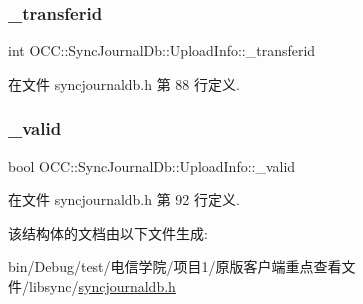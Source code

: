 \subsubsection{\texorpdfstring{\+\_\+transferid}{\_transferid}}
{\footnotesize\ttfamily int O\+C\+C\+::\+Sync\+Journal\+Db\+::\+Upload\+Info\+::\+\_\+transferid}



在文件 syncjournaldb.\+h 第 88 行定义.

\mbox{\label{struct_o_c_c_1_1_sync_journal_db_1_1_upload_info_a4742d1331bae058daccd0f4ec11c498a}} 
\subsubsection{\texorpdfstring{\+\_\+valid}{\_valid}}
{\footnotesize\ttfamily bool O\+C\+C\+::\+Sync\+Journal\+Db\+::\+Upload\+Info\+::\+\_\+valid}



在文件 syncjournaldb.\+h 第 92 行定义.



该结构体的文档由以下文件生成\+:\begin{DoxyCompactItemize}
\item 
bin/\+Debug/test/电信学院/项目1/原版客户端重点查看文件/libsync/\hyperlink{syncjournaldb_8h}{syncjournaldb.\+h}\end{DoxyCompactItemize}
